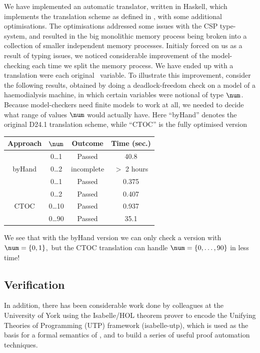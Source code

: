 We have implemented an automatic translator, written in Haskell,
which implements the translation scheme as defined in \cite{compassd241},
with some additional optimisations.
The optimisations addressed some issues with the CSP type-system,
and resulted in the big monolithic memory process being broken
into a collection of smaller independent memory processes.
Initialy forced on us as a result of typing issues,
we noticed considerable improvement of the model-checking
each time we split the memory process.
We have ended up with a translation were each original \Circus\ variable.
To illustrate this improvement,
consider the following results,
obtained by doing a deadlock-freedom check on a model of a haemodialysis
machine, in which certain variables were notional of type $\num$.
Because model-checkers need finite models to work at all,
we needed to decide what range of values $\num$ would actually have.
Here ``byHand'' denotes the original D24.1 translation scheme,
while ``CTOC'' is the fully optimised version

\begin{tabular}{|c|c|c|c|}
\hline
   Approach & $\num$ & Outcome & Time (sec.)
\\\hline\hline
          & 0\dots1 & Passed & 40.8
\\\hline
  byHand  & 0\dots2 & incomplete & $>$ 2 hours
\\\hline\hline
          & 0\dots1 & Passed & 0.375
\\\hline
          & 0\dots2 & Passed & 0.407
\\\hline
  CTOC    & 0\dots10 & Passed & 0.937
\\\hline
          & 0\dots90 & Passed & 35.1
\\\hline
\end{tabular}

We see that with the byHand version we can only check a version
with $\num = \{0,1\}$,\
but the CTOC translation can handle $\num=\{0,\dots,90\}$
in less time!


\subsection{Verification}

In addition, there has been considerable work done by colleagues at
the University of York using the Isabelle/HOL theorem prover\cite{NPW02}
to encode the Unifying Theories of Programming (UTP) framework (\textsf{isabelle-utp}),
which is used as the basis for a formal semantics of \Circus,
and to build a series of useful proof automation techniques\cite{FosterZW14}.

